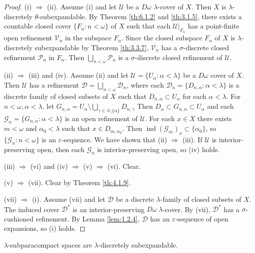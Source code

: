 \documentclass[jisng6ii.tex]{subfiles}
\begin{document}
\begin{proof} (i) $\Rightarrow$ (ii). Assume (i) and let $\mathscr{U}$ be a 
$D\omega$ $\lambda$-cover of $X$. Then $X$ is $\lambda$-discretely $\theta$-subexpandable. 
By Theorem \ref{th:6.1.2} and \ref{th:3.1.5}, there exists a countable closed cover 
$\{F_n: n < \omega\}$ of $X$ such that each $\mathscr{U}|_{F_n}$ has a 
point-finite open refinement $\mathscr{V}_n$ in the subspace $F_n$. 
Since the closed subspace $F_n$ of $X$ is $\lambda$-discretely subexpandable by 
Theorem \ref{th:3.3.7}, $\mathscr{V}_n$ has a $\sigma$-discrete closed refinement 
$\mathscr{P}_n$ in $F_n$. Then $\bigcup_{n<\omega} \mathscr{P}_n$ is a 
$\sigma$-discrete closed refinement of $\mathscr{U}$.

(ii) $\Rightarrow$ (iii) and (iv). Assume (ii) and let $\mathscr{U}=\{U_\alpha: \alpha < \lambda\}$ 
be a $D\omega$ cover of $X$. Then $\mathscr{U}$ has a refinement 
$\mathscr{D} = \bigcup_{n < \omega}\mathscr{D}_n$, where each
 $\mathscr{D}_n = \{D_{n,\alpha}: \alpha< \lambda\}$ is a discrete family of closed subsets 
 of $X$ such that $D_{n,\alpha}\subset U_\alpha$ for each $\alpha < \lambda$. 
 For $n < \omega, \alpha < \lambda$, let 
 $G_{n,\alpha} = U_\alpha\setminus \bigcup_{\gamma\in \lambda\setminus\{\alpha\}}D_{n,\gamma}$
 Then $D_\alpha \subset G_{n, \alpha}\subset U_\alpha$ and 
 each $\mathscr{G}_n = \{G_{n,\alpha}: \alpha< \lambda\}$ is an open refinement of $\mathscr{U}$.
 For each $x\in X$ there exists $m<\omega$ and $\alpha_0 < \lambda$ such that 
 $x\in D_{m,\alpha_0}$. Then
 $\operatorname{ind}(\mathscr{G}_m)_x \subset \{\alpha_0\}$, so $\{\mathscr{G}_n: n < \omega\}$ is
 an $\varepsilon$-sequence. We have shown that (ii) $\Rightarrow$ (iii). If $\mathscr{U}$ is
 interior-preserving open, then each $\mathscr{G}_n$ is interior-preserving open,
 so (iv) holds. 

(iii) $\Rightarrow$ (vi) and (iv) $\Rightarrow$ (v) $\Rightarrow$ (vi). Clear.

(v) $\Rightarrow$ (vii). Clear by Theorem \ref{th:4.1.9}. 

(vii) $\Rightarrow$ (i). Assume (vii) and let $\mathscr{D}$ be a discrete $\lambda$-family 
of closed subsets of $X$. The induced cover $\mathscr{D}^*$ is an interior-preserving 
$D\omega \; \lambda$-cover. By (vii), $\mathscr{D}^*$ has a $\sigma$-cushioned refinement. By Lemma
\ref{lem:1.2.4}, $\mathscr{D}$ has an $\varepsilon$-sequence of open expansions, so (i) holds.
\end{proof}

{\corollary{} \label{cor:6.2.2}
$\lambda$-subparacompact spaces are $\lambda$-discretely subexpandable. \hfill
}
\end{document}
